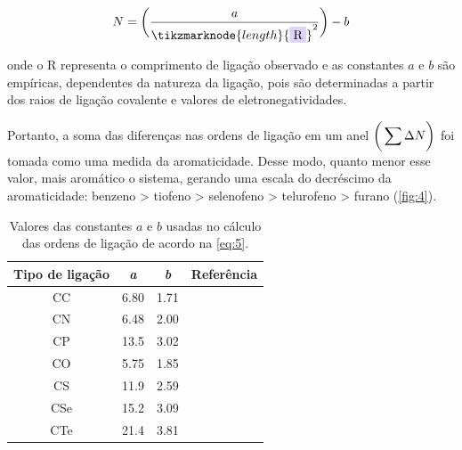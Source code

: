 \begin{figure}[htb]
\begin{equation}
    \label{eq:5}
    N = \bigg{(} \frac{a}{\tikzmarknode{length}{\highlight{blue}{R}}^2} \bigg{)} - b
\end{equation}
\vspace{2\baselineskip}
\end{figure}

\noindent onde o R representa o comprimento de ligação observado e as constantes $a$ e $b$ são empíricas, dependentes da natureza da ligação, pois são determinadas a partir dos raios de ligação covalente e valores de eletronegatividades.

Portanto, a soma das diferenças nas ordens de ligação em um anel $\bigg{(} \displaystyle \sum \Delta N \bigg{)}$ foi tomada como uma medida da aromaticidade. Desse modo, quanto menor esse valor, mais aromático o sistema, gerando uma escala do decréscimo da aromaticidade: benzeno > tiofeno > selenofeno > telurofeno > furano \autocite{Fringuelli1974} (\autoref{fig:4}). 

\begin{table}[htb]
	\centering
	\caption{\label{tab:1} Valores das constantes $a$ e $b$ usadas no cálculo das ordens de ligação de acordo na \autoref{eq:5}.}
	\begin{tabular}{cccc}
		\toprule
		\textbf{Tipo de ligação} & \textbf{\textit{a}} & \textbf{\textit{b}} & \textbf{Referência}
		\\ 
		\midrule
        CC & 6.80 & 1.71 & \cite{Gordy1947} \\
        CN & 6.48 & 2.00 & \cite{Gordy1947} \\
        CP & 13.5 & 3.02 & \cite{Gordy1947} \\
        CO & 5.75 & 1.85 & \cite{Gordy1947} \\
        CS & 11.9 & 2.59 & \cite{Gordy1947} \\
        CSe & 15.2 & 3.09 & \cite{Fringuelli1974}\\
        CTe & 21.4 & 3.81 & \cite{Fringuelli1974}\\
    \bottomrule
	\end{tabular}
\end{table}



